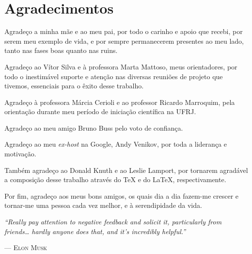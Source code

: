 
\dedication{Dedico esse trabalho aos meus pais.}

\chapter*{Agradecimentos}

Agradeço a minha mãe e ao meu pai, por todo o carinho e apoio que recebi, por serem meu exemplo de vida, e por sempre permanecerem presentes ao meu lado, tanto nas fases boas quanto nas ruins.

Agradeço ao Vítor Silva e à professora Marta Mattoso, meus orientadores, por todo o inestimável suporte e atenção nas diversas reuniões de projeto que tivemos, essenciais para o êxito desse trabalho.

Agradeço à professora Márcia Cerioli e ao professor Ricardo Marroquim, pela orientação durante meu período de iniciação científica na UFRJ.

Agradeço ao meu amigo Bruno Buss pelo voto de confiança.

Agradeço ao meu \textit{ex-host} na Google, Andy Venikov, por toda a liderança e motivação.

Também agradeço ao Donald Knuth e ao Leslie Lamport, por tornarem agradável a composição desse trabalho através do \TeX{} e do \LaTeX{}, respectivamente.

Por fim, agradeço aos meus bons amigos, os quais dia a dia fazem-me crescer e tornar-me uma pessoa cada vez melhor, e à serendipidade da vida.

\begin{center}
\end{center}

\vfill{}

\epigraph{\textit{``Really pay attention to negative feedback and solicit it, particularly from friends\ldots{} hardly anyone does that, and it's incredibly helpful.''}}{--- \textsc{Elon Musk}}
